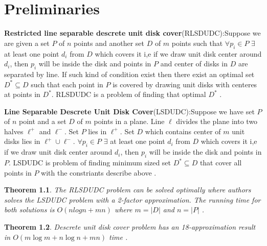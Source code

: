 \documentclass[10pt,a4wide]{report}
\theoremstyle{plain}
\newtheorem{theorem}{Theorem}[section]
\theoremstyle{definition}
\theoremstyle{remark}
\begin{document}
\chapter {Preliminaries}
\begin{description}

\item \textbf{Restricted line separable descrete unit disk cover}(RLSDUDC):Suppose we are given a set $P$ of $n$ points and another set $D$ of
                         $m$ points such that $\forall p_{i} \in P$ $\exists$ at least one point $d_{i}$ from $D$ which covers it i,e if we draw 
                         unit disk center around $d_{i}$, then $p_{i}$ will be inside the disk and points in $P$ and center of disks in $D$ are 
                         separated by line. If such kind of condition exist then there exist an optimal set $D^{\ast} \subseteq D$ such that 
                         each point in $P$ is covered by drawing unit disks with centeres at points in $D^{\ast}$.
                         RLSDUDC is a problem of finding that optimal $D^{\ast}$ \cite{FGRSR10}.
                 
\item \textbf{Line Separable Descrete Unit Disk Cover}(LSDUDC):Suppose we have set $P$ of $n$ point and a set $D$ of $m$ points in a plane.
                         Line $\ell$ divides the plane into two halves $\ell^{+}$ and $\ell^{-}$. Set $P$ lies in $\ell^{+}$.  
                         Set $D$ which contains center of $m$ unit disks lies in $\ell^{+} \cup \ell^{-}$. $\forall p_{i} \in P$ $\exists$ at 
                         least one point $d_{i}$ from $D$ which covers it i,e if we draw unit disk center around $d_{i}$, then $p_{i}$ will be 
                         inside the disk and points in $P$. LSDUDC is problem of finding minimum sized set $D^{*} \subseteq D$ that 
                         cover all points in $P$ with the constriants describe above \cite{FGRSR10}.
             \begin{theorem}
              The RLSDUDC problem can be solved optimally where authors \cite{FGRSR10} solves the LSDUDC problem with a 2-factor approximation. The running
              time for both solutions is $O(n log n + mn)$ where $m = |D|$ and $n = |P|$ .

             \end{theorem}
             \begin{theorem}
              Descrete unit disk cover problem has an 18-approximation result in $O(m \log m+ n \log n + mn)$ time \cite{GRALB12}.

             \end{theorem}


\end{description}
\end{document}
